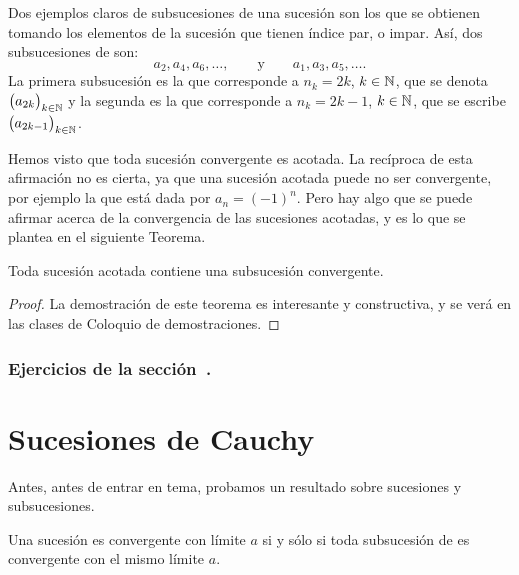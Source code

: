 Dos ejemplos claros de subsucesiones de una sucesión \sucan son los que se obtienen tomando los elementos de la sucesión que tienen índice par, o impar. Así, dos subsucesiones de \sucan son:
\[
a_2, a_4, a_6, \dots,\qquad\text{y}\qquad
a_1, a_3, a_5, \dots.
\]
La primera subsucesión es la que corresponde a $n_k = 2k$, $k\in\mathbb{N}$, que se denota $\big(a_{2k}\big)_{k\in\mathbb{N}}$ y la segunda es la que corresponde a $n_k = 2k-1$, $k\in\mathbb{N}$, que se escribe $\big(a_{2k-1}\big)_{k\in\mathbb{N}}$.

Hemos visto que toda sucesión convergente es acotada. 
La recíproca de esta afirmación no es cierta, ya que una sucesión acotada puede no ser convergente, por ejemplo la que está dada por $a_n = (-1)^n$.
Pero hay algo que se puede afirmar acerca de la convergencia de las sucesiones acotadas, y es lo que se plantea en el siguiente Teorema.

\begin{theorem}
\label{T:Bolzano-Weierstrass} 
    Toda sucesión acotada contiene una subsucesión convergente.
\end{theorem}

\begin{proof}
    La demostración de este teorema es interesante y constructiva, y se verá en las clases de Coloquio de demostraciones.
\end{proof}

\subsubsection*{Ejercicios de la sección~.}

\begin{enumerate}

\end{enumerate}


\section{Sucesiones de Cauchy}

Antes, antes de entrar en tema, probamos un resultado sobre sucesiones y subsucesiones.

\begin{proposition}\label{P:caracterizacionporsubsucesiones}
    Una sucesión \sucan es convergente con límite $a$ si y sólo si toda subsucesión de \sucan es convergente con el mismo límite $a$.
\end{proposition}

